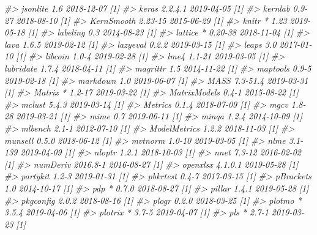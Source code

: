 \documentclass[]{krantz}
\makeatletter
\newenvironment{Shaded}{\begin{snugshade}}{\end{snugshade}}
\newcommand{\CommentTok}[1]{\textcolor[rgb]{0.37,0.37,0.37}{\textit{#1}}}
\newenvironment{kframe}{%
\medskip{}
\setlength{\fboxsep}{.8em}
 \def\at@end@of@kframe{}%
 \ifinner\ifhmode%
  \def\at@end@of@kframe{\end{minipage}}%
  \begin{minipage}{\columnwidth}%
 \fi\fi%
 \def\FrameCommand##1{\hskip\@totalleftmargin \hskip-\fboxsep
 \colorbox{shadecolor}{##1}\hskip-\fboxsep
     \hskip-\linewidth \hskip-\@totalleftmargin \hskip\columnwidth}%
 \MakeFramed {\advance\hsize-\width
   \@totalleftmargin\z@ \linewidth\hsize
   \@setminipage}}%
 {\par\unskip\endMakeFramed%
 \at@end@of@kframe}
\renewenvironment{Shaded}{\begin{kframe}}{\end{kframe}}
\makeatother
\begin{document}
\begin{Shaded}
\begin{Highlighting}[]
\CommentTok{#>    jsonlite        1.6        2018-12-07 [1]}
\CommentTok{#>    keras           2.2.4.1    2019-04-05 [1]}
\CommentTok{#>    kernlab         0.9-27     2018-08-10 [1]}
\CommentTok{#>    KernSmooth      2.23-15    2015-06-29 [1]}
\CommentTok{#>    knitr         * 1.23       2019-05-18 [1]}
\CommentTok{#>    labeling        0.3        2014-08-23 [1]}
\CommentTok{#>    lattice       * 0.20-38    2018-11-04 [1]}
\CommentTok{#>    lava            1.6.5      2019-02-12 [1]}
\CommentTok{#>    lazyeval        0.2.2      2019-03-15 [1]}
\CommentTok{#>    leaps           3.0        2017-01-10 [1]}
\CommentTok{#>    libcoin         1.0-4      2019-02-28 [1]}
\CommentTok{#>    lme4            1.1-21     2019-03-05 [1]}
\CommentTok{#>    lubridate       1.7.4      2018-04-11 [1]}
\CommentTok{#>    magrittr        1.5        2014-11-22 [1]}
\CommentTok{#>    maptools        0.9-5      2019-02-18 [1]}
\CommentTok{#>    markdown        1.0        2019-06-07 [1]}
\CommentTok{#>    MASS            7.3-51.4   2019-03-31 [1]}
\CommentTok{#>    Matrix        * 1.2-17     2019-03-22 [1]}
\CommentTok{#>    MatrixModels    0.4-1      2015-08-22 [1]}
\CommentTok{#>    mclust          5.4.3      2019-03-14 [1]}
\CommentTok{#>    Metrics         0.1.4      2018-07-09 [1]}
\CommentTok{#>    mgcv            1.8-28     2019-03-21 [1]}
\CommentTok{#>    mime            0.7        2019-06-11 [1]}
\CommentTok{#>    minqa           1.2.4      2014-10-09 [1]}
\CommentTok{#>    mlbench         2.1-1      2012-07-10 [1]}
\CommentTok{#>    ModelMetrics    1.2.2      2018-11-03 [1]}
\CommentTok{#>    munsell         0.5.0      2018-06-12 [1]}
\CommentTok{#>    mvtnorm         1.0-10     2019-03-05 [1]}
\CommentTok{#>    nlme            3.1-139    2019-04-09 [1]}
\CommentTok{#>    nloptr          1.2.1      2018-10-03 [1]}
\CommentTok{#>    nnet            7.3-12     2016-02-02 [1]}
\CommentTok{#>    numDeriv        2016.8-1   2016-08-27 [1]}
\CommentTok{#>    openxlsx        4.1.0.1    2019-05-28 [1]}
\CommentTok{#>    partykit        1.2-3      2019-01-31 [1]}
\CommentTok{#>    pbkrtest        0.4-7      2017-03-15 [1]}
\CommentTok{#>    pBrackets       1.0        2014-10-17 [1]}
\CommentTok{#>    pdp           * 0.7.0      2018-08-27 [1]}
\CommentTok{#>    pillar          1.4.1      2019-05-28 [1]}
\CommentTok{#>    pkgconfig       2.0.2      2018-08-16 [1]}
\CommentTok{#>    plogr           0.2.0      2018-03-25 [1]}
\CommentTok{#>    plotmo        * 3.5.4      2019-04-06 [1]}
\CommentTok{#>    plotrix       * 3.7-5      2019-04-07 [1]}
\CommentTok{#>    pls           * 2.7-1      2019-03-23 [1]}

\end{Highlighting}
\end{Shaded}
\end{document}
